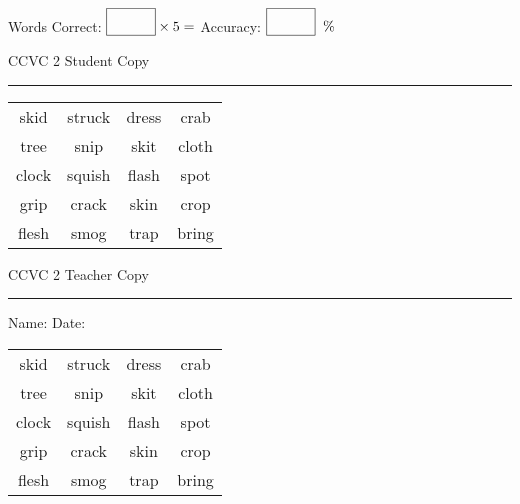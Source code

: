 \documentclass{memoir}
\begin{document}
\normalsize

Words Correct: $\fbox{\phantom{\huge 100}} \times 5 = $ Accuracy: $\fbox{\phantom{\huge 100}}\;\; \%$ 

\vfill

\newpage


\footnotesize \noindent
CCVC 2 \hfill Student Copy
\smallskip
\hrule

\Large

\setlength{\tabcolsep}{14pt}
\def\arraystretch{3}

{\selectfont


\begin{vplace}[0.5]
\begin{center}
\begin{tabular}{cccc}
skid & struck & dress & crab        \\
tree & snip & skit & cloth \\
clock & squish & flash             & spot \\
grip      & crack       & skin & crop \\
flesh             & smog & trap & bring      \\
\end{tabular}
\end{center}
\end{vplace}

}

\newpage

\footnotesize \noindent
CCVC 2 \hfill Teacher Copy
\smallskip
\hrule

\normalsize

\vfill

\noindent
Name: \underline{\hspace{1.75in}} \hfill Date: \underline{\hspace{1in}}

\Large

{\selectfont


\begin{vplace}[0.5]
\begin{center}
\begin{tabular}{cccc}
skid & struck & dress & crab        \\
tree & snip & skit & cloth \\
clock & squish & flash             & spot \\
grip      & crack       & skin & crop \\
flesh             & smog & trap & bring      \\
\end{tabular}
\end{center}
\end{vplace}



}
\end{document}
